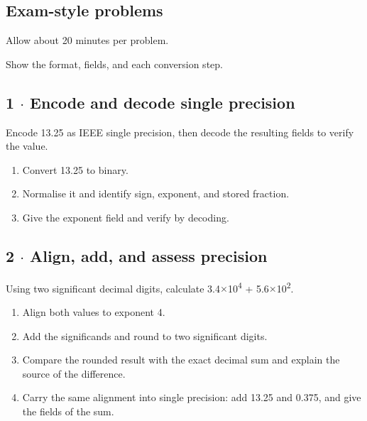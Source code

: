 \documentclass[11pt]{article}
\begin{document}
\begin{keepsection}
\section{Exam-style problems}

Allow about 20 minutes per problem.

Show the format, fields, and each conversion step.

\begin{keepsection}
\subsection{1 \ensuremath{\cdot} Encode and decode single precision}

Encode 13.25 as IEEE single precision, then decode the resulting fields to verify the value.

\begin{enumerate}
\item Convert 13.25 to binary.
\item Normalise it and identify sign, exponent, and stored fraction.
\item Give the exponent field and verify by decoding.
\end{enumerate}

\end{keepsection}

\begin{keepsection}
\subsection{2 \ensuremath{\cdot} Align, add, and assess precision}

Using two significant decimal digits, calculate 3.4\ensuremath{\times}10\textsuperscript{4} + 5.6\ensuremath{\times}10\textsuperscript{2}.

\begin{enumerate}
\item Align both values to exponent 4.
\item Add the significands and round to two significant digits.
\item Compare the rounded result with the exact decimal sum and explain the source of the difference.
\item Carry the same alignment into single precision: add 13.25 and 0.375, and give the fields of the sum.
\end{enumerate}

\end{keepsection}
\end{keepsection}
\end{document}
